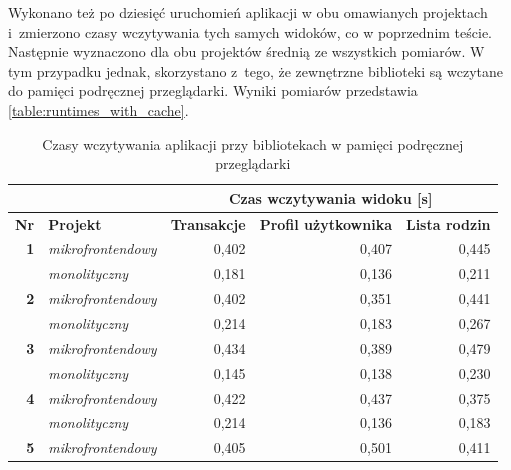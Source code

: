 \documentclass{SGGW-thesis}
\begin{document}
    Wykonano też po dziesięć uruchomień aplikacji w obu omawianych projektach i~zmierzono czasy wczytywania tych samych widoków, co w poprzednim teście. Następnie wyznaczono dla obu projektów średnią ze wszystkich pomiarów. W tym przypadku jednak, skorzystano z~tego, że zewnętrzne biblioteki są wczytane do pamięci podręcznej przeglądarki. Wyniki pomiarów przedstawia \cref{table:runtimes_with_cache}.
    
    \vfill

    \begin{table}[]
      \centering
      \caption{Czasy wczytywania aplikacji przy bibliotekach w pamięci podręcznej przeglądarki}
      \begin{tabular}{ll|rrr|}
      \cline{3-5}
       &  & \multicolumn{3}{c|}{\textbf{Czas wczytywania widoku {[}s{]}}} \\ \hline
      \multicolumn{1}{|l|}{\textbf{Nr}} & \textbf{Projekt} & \multicolumn{1}{l|}{\textbf{Transakcje}} & \multicolumn{1}{l|}{\textbf{Profil użytkownika}} & \multicolumn{1}{l|}{\textbf{Lista rodzin}} \\ \hline
      \multicolumn{1}{|r|}{\textbf{1}} & \textit{mikrofrontendowy} & \multicolumn{1}{r|}{0,402} & \multicolumn{1}{r|}{0,407} & 0,445 \\ \hline
      \multicolumn{1}{|l|}{\textbf{}} & \textit{monolityczny} & \multicolumn{1}{r|}{0,181} & \multicolumn{1}{r|}{0,136} & 0,211 \\ \hline
      \multicolumn{1}{|r|}{\textbf{2}} & \textit{mikrofrontendowy} & \multicolumn{1}{r|}{0,402} & \multicolumn{1}{r|}{0,351} & 0,441 \\ \hline
      \multicolumn{1}{|l|}{\textbf{}} & \textit{monolityczny} & \multicolumn{1}{r|}{0,214} & \multicolumn{1}{r|}{0,183} & 0,267 \\ \hline
      \multicolumn{1}{|r|}{\textbf{3}} & \textit{mikrofrontendowy} & \multicolumn{1}{r|}{0,434} & \multicolumn{1}{r|}{0,389} & 0,479 \\ \hline
      \multicolumn{1}{|l|}{\textbf{}} & \textit{monolityczny} & \multicolumn{1}{r|}{0,145} & \multicolumn{1}{r|}{0,138} & 0,230 \\ \hline
      \multicolumn{1}{|r|}{\textbf{4}} & \textit{mikrofrontendowy} & \multicolumn{1}{r|}{0,422} & \multicolumn{1}{r|}{0,437} & 0,375 \\ \hline
      \multicolumn{1}{|l|}{\textbf{}} & \textit{monolityczny} & \multicolumn{1}{r|}{0,214} & \multicolumn{1}{r|}{0,136} & 0,183 \\ \hline
      \multicolumn{1}{|r|}{\textbf{5}} & \textit{mikrofrontendowy} & \multicolumn{1}{r|}{0,405} & \multicolumn{1}{r|}{0,501} & 0,411 \\ \hline

\end{tabular}
\end{table}
\end{document}
